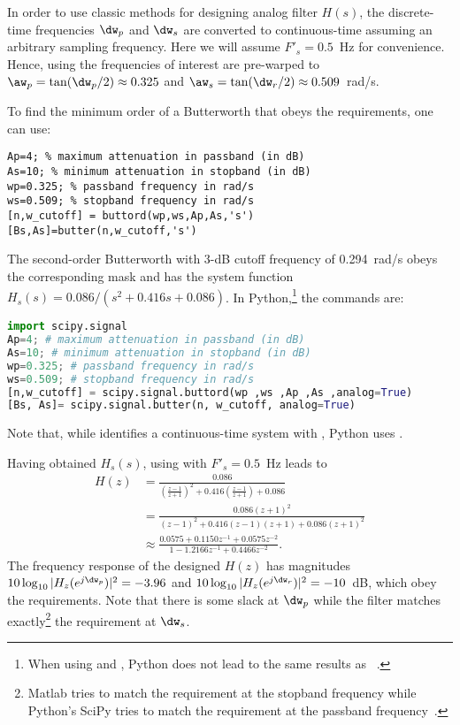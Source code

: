 In order to use classic methods for designing analog filter $H(s)$, the discrete-time frequencies
$\dw_p$ and $\dw_s$ are converted to continuous-time assuming an arbitrary sampling frequency. Here we will assume
$F'_s=0.5$~Hz for convenience. Hence, using  the frequencies of interest are pre-warped to $\aw_p=\tan(\dw_p/2) \approx 0.325$ and $\aw_s=\tan(\dw_r/2) \approx 0.509$~rad/s.

To find the minimum order of a Butterworth that obeys the requirements, one can use:
\begin{lstlisting}
Ap=4; % maximum attenuation in passband (in dB)
As=10; % minimum attenuation in stopband (in dB)
wp=0.325; % passband frequency in rad/s
ws=0.509; % stopband frequency in rad/s
[n,w_cutoff] = buttord(wp,ws,Ap,As,'s')
[Bs,As]=butter(n,w_cutoff,'s')
\end{lstlisting}
The second-order Butterworth with
3-dB cutoff frequency of 0.294~rad/s obeys the corresponding mask and has the system function 
$H_s(s)=0.086/(s^2 + 0.416s + 0.086)$.
In Python,\footnote{When using  and , Python does not lead to the same results as {\matlab}~.} the commands are:
\begin{lstlisting}[language=Python]
import scipy.signal
Ap=4; # maximum attenuation in passband (in dB)
As=10; # minimum attenuation in stopband (in dB)
wp=0.325; # passband frequency in rad/s
ws=0.509; # stopband frequency in rad/s
[n,w_cutoff] = scipy.signal.buttord(wp ,ws ,Ap ,As ,analog=True)
[Bs, As]= scipy.signal.butter(n, w_cutoff, analog=True)
\end{lstlisting}
Note that, while {\matlab} identifies a continuous-time system with , Python uses .

Having obtained $H_s(s)$,
using  with $F'_s=0.5$~Hz leads to
\begin{align*}
H(z) &= \frac{0.086}{ \left( \frac{z-1}{z+1} \right)^2 + 0.416 \left( \frac{z-1}{z+1} \right) + 0.086} \\
 &= \frac{0.086(z+1)^2}{ \left( z-1 \right)^2 + 0.416 \left(z-1\right)\left(z+1\right) + 0.086 \left(z+1\right)^2} \\
 &\approx \frac{0.0575 + 0.1150z^{-1} + 0.0575 z^{-2} }{1   -1.2166 z^{-1} +    0.4466 z^{-2} }.
\end{align*}
The frequency response of the designed $H(z)$ has magnitudes $10 \log_{10}|H_z(e^{j\dw_p})|^2 = -3.96$ and 
$10 \log_{10}|H_z(e^{j\dw_r})|^2 = -10$~dB, which obey the requirements. Note that there is some slack
at $\dw_p$ while the filter matches exactly\footnote{Matlab tries to match the requirement at the stopband frequency while Python's SciPy tries to match the requirement at the passband frequency~.} the requirement at $\dw_s$.
\eExample

